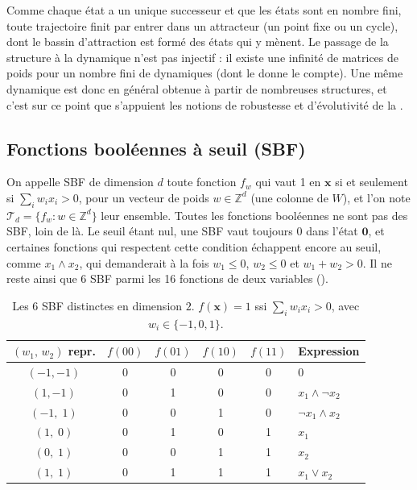 \documentclass[12pt, a4paper]{article}
\begin{document}
Comme chaque état a un unique successeur et que les états sont en nombre fini, toute trajectoire finit par entrer dans un attracteur (un point fixe ou un cycle), dont le bassin d'attraction est formé des états qui y mènent.
Le passage de la structure à la dynamique n'est pas injectif : il existe une infinité de matrices de poids pour un nombre fini de dynamiques (dont le  donne le compte).
Une même dynamique est donc en général obtenue à partir de nombreuses structures, et c'est sur ce point que s'appuient les notions de robustesse et d'évolutivité de la .


\subsection{Fonctions booléennes à seuil (SBF)}
\label{sec:sbf}

On appelle SBF de dimension $d$ toute fonction $f_w$ qui vaut 1 en $\mathbf{x}$ si et seulement si $\sum_i w_i x_i > 0$, pour un vecteur de poids $w \in \mathbb{Z}^d$ (une colonne de $W$), et l'on note $\mathcal{T}_d = \{ f_w : w \in \mathbb{Z}^d \}$ leur ensemble.
Toutes les fonctions booléennes ne sont pas des SBF, loin de là.
Le seuil étant nul, une SBF vaut toujours 0 dans l'état $\mathbf{0}$, et certaines fonctions qui respectent cette condition échappent encore au seuil, comme $x_1 \wedge x_2$, qui demanderait à la fois $w_1 \le 0$, $w_2 \le 0$ et $w_1 + w_2 > 0$.
Il ne reste ainsi que 6 SBF parmi les 16 fonctions de deux variables ().

\begin{table}[htbp]
\centering
\caption{Les 6 SBF distinctes en dimension $2$. $f(\mathbf{x}) = 1$ ssi $\sum_i w_i x_i > 0$, avec $w_i \in \{-1, 0, 1\}$.}
\label{tab:sbf2}
\begin{tabular}{cccccl}
\toprule
$(w_1,\,w_2)$ repr. & $f(00)$ & $f(01)$ & $f(10)$ & $f(11)$ & Expression \\
\midrule
$(-1,-1)$ & 0 & 0 & 0 & 0 & $0$ \\
$(1,-1)$  & 0 & 1 & 0 & 0 & $x_1 \wedge \neg x_2$ \\
$(-1,\;1)$  & 0 & 0 & 1 & 0 & $\neg x_1 \wedge x_2$ \\
$(1,\;0)$   & 0 & 1 & 0 & 1 & $x_1$ \\
$(0,\;1)$   & 0 & 0 & 1 & 1 & $x_2$ \\
$(1,\;1)$   & 0 & 1 & 1 & 1 & $x_1 \vee x_2$ \\
\bottomrule
\end{tabular}
\end{table}
\end{document}
